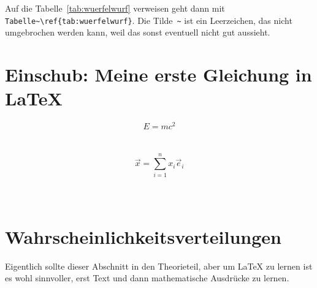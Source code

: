 \documentclass[12pt,a4paper]{scrartcl}
\begin{document}
Auf die Tabelle~\ref{tab:wuerfelwurf} verweisen geht dann mit 
\verb!Tabelle~\ref{tab:wuerfelwurf}!. Die Tilde~\verb!~! ist ein Leerzeichen, 
das nicht umgebrochen werden kann, weil das sonst eventuell nicht gut aussieht.
\begin{center}
\end{center}

\section{Einschub: Meine erste Gleichung in \LaTeX{}}
\begin{equation}
    E = m c^2
\end{equation}
\cprotect{}\\ \\ 
\begin{equation}
    \vec{x} = \sum\limits_{i = 1}^{n} x_i \vec{e}_i
\end{equation}
\cprotect{}\\ \\ 


\section{Wahrscheinlichkeitsverteilungen}
Eigentlich sollte dieser Abschnitt in den Theorieteil, aber um \LaTeX{} zu
lernen ist es wohl sinnvoller, erst Text und dann mathematische Ausdrücke
zu lernen.
\end{document}
